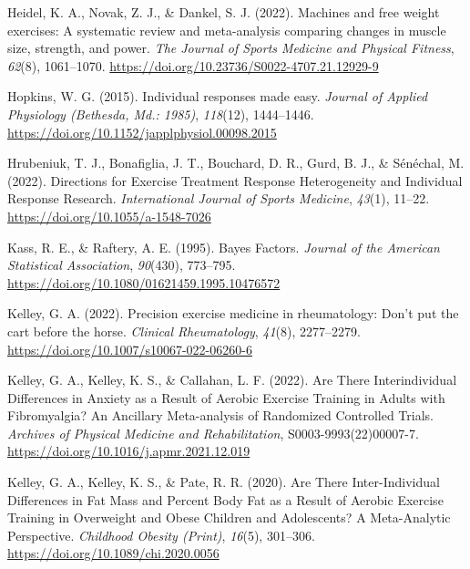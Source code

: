 \documentclass[
]{article}
\newlength{\cslhangindent}
\newlength{\cslentryspacingunit} %
\newenvironment{CSLReferences}[2] %
 {%
  \setlength{\parindent}{0pt}
  \ifodd #1
  \let\oldpar\par
  \def\par{\hangindent=\cslhangindent\oldpar}
  \fi
  \setlength{\parskip}{#2\cslentryspacingunit}
 }%
 {}
\begin{document}
\begin{CSLReferences}{1}{0}
\leavevmode{}%
Heidel, K. A., Novak, Z. J., \& Dankel, S. J. (2022). Machines and free weight exercises: A systematic review and meta-analysis comparing changes in muscle size, strength, and power. \emph{The Journal of Sports Medicine and Physical Fitness}, \emph{62}(8), 1061--1070. \url{https://doi.org/10.23736/S0022-4707.21.12929-9}

\leavevmode{}%
Hopkins, W. G. (2015). Individual responses made easy. \emph{Journal of Applied Physiology (Bethesda, Md.: 1985)}, \emph{118}(12), 1444--1446. \url{https://doi.org/10.1152/japplphysiol.00098.2015}

\leavevmode{}%
Hrubeniuk, T. J., Bonafiglia, J. T., Bouchard, D. R., Gurd, B. J., \& Sénéchal, M. (2022). Directions for {Exercise} {Treatment} {Response} {Heterogeneity} and {Individual} {Response} {Research}. \emph{International Journal of Sports Medicine}, \emph{43}(1), 11--22. \url{https://doi.org/10.1055/a-1548-7026}

\leavevmode{}%
Kass, R. E., \& Raftery, A. E. (1995). Bayes {Factors}. \emph{Journal of the American Statistical Association}, \emph{90}(430), 773--795. \url{https://doi.org/10.1080/01621459.1995.10476572}

\leavevmode{}%
Kelley, G. A. (2022). Precision exercise medicine in rheumatology: {Don}'t put the cart before the horse. \emph{Clinical Rheumatology}, \emph{41}(8), 2277--2279. \url{https://doi.org/10.1007/s10067-022-06260-6}

\leavevmode{}%
Kelley, G. A., Kelley, K. S., \& Callahan, L. F. (2022). Are {There} {Interindividual} {Differences} in {Anxiety} as a {Result} of {Aerobic} {Exercise} {Training} in {Adults} with {Fibromyalgia}? {An} {Ancillary} {Meta}-analysis of {Randomized} {Controlled} {Trials}. \emph{Archives of Physical Medicine and Rehabilitation}, S0003-9993(22)00007-7. \url{https://doi.org/10.1016/j.apmr.2021.12.019}

\leavevmode{}%
Kelley, G. A., Kelley, K. S., \& Pate, R. R. (2020). Are {There} {Inter}-{Individual} {Differences} in {Fat} {Mass} and {Percent} {Body} {Fat} as a {Result} of {Aerobic} {Exercise} {Training} in {Overweight} and {Obese} {Children} and {Adolescents}? {A} {Meta}-{Analytic} {Perspective}. \emph{Childhood Obesity (Print)}, \emph{16}(5), 301--306. \url{https://doi.org/10.1089/chi.2020.0056}


\end{CSLReferences}
\end{document}
